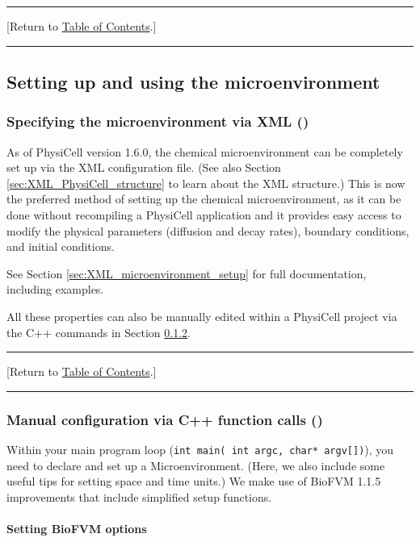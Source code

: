 \documentclass[12pt]{article}
\renewcommand{\v}{\verb}
\newcommand{\TOClink}{\begin{center}\hrule\vskip-5pt\phantom{.}\hfill[Return to \hyperlink{TOC}{Table of Contents}.]\hfill\phantom{.}\vskip3pt\hrule\end{center}}
\begin{document}
\TOClink 

\subsection{Setting up and using the microenvironment}
\label{sec:set_up_BioFVM}

\subsubsection{Specifying the microenvironment via XML ()}
\label{sec:BioFVM_setup_XML}
As of PhysiCell version 1.6.0, the chemical microenvironment can be completely 
set up via the XML configuration file. (See also Section \ref{sec:XML_PhysiCell_structure} to 
learn about the XML structure.) This is now the preferred method of setting up the chemical microenvironment, 
as it can be done without recompiling a PhysiCell application and it provides easy 
access to modify the physical parameters (diffusion and decay rates), boundary conditions, 
and initial conditions. 

See Section \ref{sec:XML_microenvironment_setup} for full documentation, including examples. 

All these properties can also be manually edited within a PhysiCell 
project via the C++ commands in Section \ref{sec:BioFVM_manual_setup_options}. 

\TOClink 

\subsubsection{Manual configuration via C++ function calls ()}
\label{sec:BioFVM_manual_setup_options}

Within your main program loop (\v|int main( int argc, char* argv[])|), you need to declare and 
set up a Microenvironment. (Here, we also include some useful tips for setting space and time 
units.) We make use of BioFVM 1.1.5 improvements that 
include simplified setup functions. 

\paragraph{Setting BioFVM options}
\label{sec:BioFVM_options}
\end{document}
